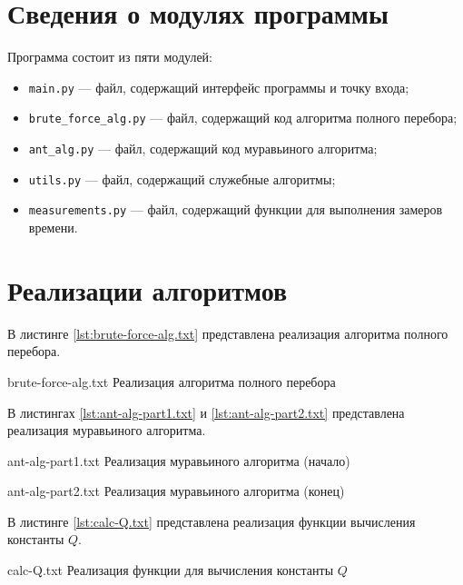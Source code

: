 \section{Сведения о модулях программы}

Программа состоит из пяти модулей: 

\begin{itemize}[label*=--]
	\item \texttt{main.py} --- файл, содержащий интерфейс программы и точку входа;
	\item \texttt{brute\_force\_alg.py} --- файл, содержащий код алгоритма полного перебора;
	\item \texttt{ant\_alg.py} --- файл, содержащий код муравьиного алгоритма;
	\item \texttt{utils.py} --- файл, содержащий служебные алгоритмы;
	\item \texttt{measurements.py} --- файл, содержащий функции для выполнения замеров времени.
\end{itemize}

\section{Реализации алгоритмов}

В листинге \ref{lst:brute-force-alg.txt} представлена реализация алгоритма полного перебора.

\clearpage

{brute-force-alg.txt} %
{Реализация алгоритма полного перебора} %

В листингах \ref{lst:ant-alg-part1.txt} и \ref{lst:ant-alg-part2.txt} представлена реализация муравьиного алгоритма.

{ant-alg-part1.txt} %
{Реализация муравьиного алгоритма (начало)} %

\clearpage

{ant-alg-part2.txt} %
{Реализация муравьиного алгоритма (конец)} %

В листинге \ref{lst:calc-Q.txt} представлена реализация функции вычисления константы $Q$.

{calc-Q.txt} %
{Реализация функции для вычисления константы $Q$} %

